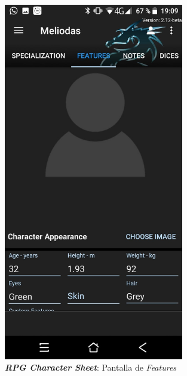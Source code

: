 \begin{figure}[H]
\begin{minipage}{0.3\textwidth}
    \end{minipage} \hspace{2cm}
    \begin{minipage}{0.3\textwidth}
        \centering
        \includegraphics[width=0.7\textwidth]{Images/RPG_Character_Sheet_2.jpeg}
        \caption{\textit{\textbf{RPG Character Sheet}}: Pantalla de 
        \textit{Features}}
    \end{minipage}
\end{figure}
